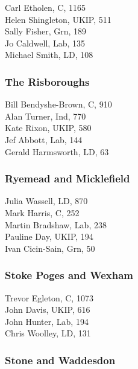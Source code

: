 \documentclass[a4paper,openany,10pt]{book}
\begin{document}
Carl Etholen, C, 1165\\
Helen Shingleton, UKIP, 511\\
Sally Fisher, Grn, 189\\
Jo Caldwell, Lab, 135\\
Michael Smith, LD, 108\\


\subsubsection*{The Risboroughs}



Bill Bendyshe-Brown, C, 910\\
Alan Turner, Ind, 770\\
Kate Rixon, UKIP, 580\\
Jef Abbott, Lab, 144\\
Gerald Harmsworth, LD, 63\\


\subsubsection*{Ryemead and Micklefield}



Julia Wassell, LD, 870\\
Mark Harris, C, 252\\
Martin Bradshaw, Lab, 238\\
Pauline Day, UKIP, 194\\
Ivan Cicin-Sain, Grn, 50\\


\subsubsection*{Stoke Poges and Wexham}



Trevor Egleton, C, 1073\\
John Davis, UKIP, 616\\
John Hunter, Lab, 194\\
Chris Woolley, LD, 131\\


\subsubsection*{Stone and Waddesdon}
\end{document}
